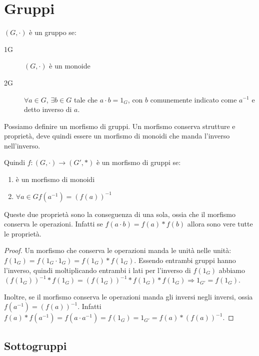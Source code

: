 \section{Gruppi}

\begin{defn}
$(G, \cdot)$ \`e un gruppo se:
\begin{description}
    \item[1G] $(G, \cdot)$ \`e un monoide
    \item[2G] $\forall a \in G $, $ \exists b \in G $ tale che $a \cdot b = 1_G$, con $b$ comunemente indicato come $a^{-1}$ e detto inverso di $a$.
\end{description}
\end{defn}

Possiamo definire un morfismo di gruppi. Un morfismo conserva strutture e propriet\`a, deve quindi essere un morfismo di monoidi che manda l'inverso nell'inverso.
\begin{defn}
Quindi $f : (G, \cdot) \to (G', \ast)$ \`e un morfismo di gruppi se:
\begin{enumerate}
    \item \`e un morfismo di monoidi
    \item $\forall a \in G f(a^{-1}) = (f(a))^{-1}$
\end{enumerate}
\end{defn}
\begin{prop}
Queste due propriet\`a sono la conseguenza di una sola, ossia che il morfismo conserva le operazioni. Infatti se $f(a \cdot b) = f(a) \ast f(b)$ allora sono vere tutte le propriet\`a.
\end{prop}
\begin{proof}
Un morfismo che conserva le operazioni manda le unit\`a nelle unit\`a: $f(1_G) = f(1_G \cdot 1_G) = f(1_G) \ast f(1_G)$. Essendo entrambi gruppi hanno l'inverso, quindi moltiplicando entrambi i lati per l'inverso di $f(1_G)$ abbiamo $(f(1_G))^{-1} \ast f(1_G) = (f(1_G))^{-1} \ast f(1_G) \ast f(1_G) \Rightarrow 1_{G'} = f(1_G)$.

Inoltre, se il morfismo conserva le operazioni manda gli inversi negli inversi, ossia $f(a^{-1}) = (f(a))^{-1}$. Infatti $f(a) \ast f(a^{-1}) = f(a \cdot a^{-1}) = f(1_G) = 1_{G'} = f(a) \ast (f(a))^{-1}$.
\end{proof}

\subsection{Sottogruppi}

